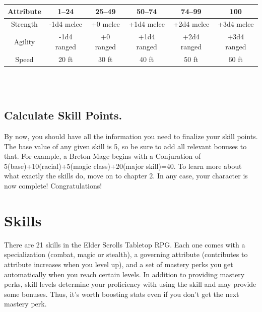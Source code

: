 \documentclass[12pt]{book}
\begin{document}
\begin{tabular}{|c|c|c|c|c|c|}
\hline
Attribute & 1--24 & 25--49 & 50--74 & 74--99 & 100\\ \hline
Strength & -1d4 melee & +0 melee & +1d4 melee & +2d4 melee & +3d4 melee\\ \hline
Agility & -1d4 ranged & +0 ranged & +1d4 ranged & +2d4 ranged & +3d4 ranged\\ \hline
Speed & 20 ft & 30 ft & 40 ft & 50 ft & 60 ft\\ \hline

\end{tabular}\\~\\

\section{Calculate Skill Points.}
By now, you should have all the information you need to finalize your skill points. The base value of any given skill is 5, so be sure to add all relevant bonuses to that. For example, a Breton Mage begins with a Conjuration of 5(base)+10(racial)+5(magic class)+20(major skill)=40. To learn more about what exactly the skills do, move on to chapter 2. In any case, your character is now complete! Congratulations!

\chapter{Skills}

There are 21 skills in the Elder Scrolls Tabletop RPG. Each one comes with a specialization (combat, magic or stealth), a governing attribute (contributes to attribute increases when you level up), and a set of mastery perks you get automatically when you reach certain levels. In addition to providing mastery perks, skill levels determine your proficiency with using the skill and may provide some bonuses. Thus, it's worth boosting stats even if you don't get the next mastery perk.
\end{document}

